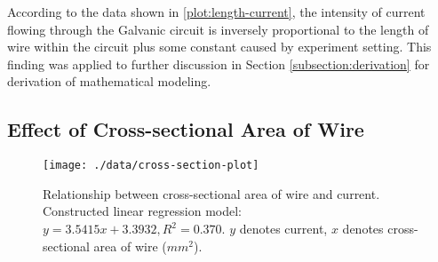 According to the data shown in \ref{plot:length-current}, the intensity of current flowing through the Galvanic circuit is inversely proportional to the length of wire within the circuit plus some constant caused by experiment setting.
This finding was applied to further discussion in Section \ref{subsection:derivation} for derivation of mathematical modeling.

\subsection{Effect of Cross-sectional Area of Wire}
\label{subsection:cross-section-current}

\begin{figure}[!t]
  \centering

  \texttt{[image: ./data/cross-section-plot]}

  \caption{Relationship between cross-sectional area of wire and current. Constructed linear regression model: $y = 3.5415x + 3.3932, R^2 = 0.370$. $y$ denotes current, $x$ denotes cross-sectional area of wire ($mm^2$).}
  \label{plot:cross-section-current}
\end{figure}

\label{subsection:derivation}

